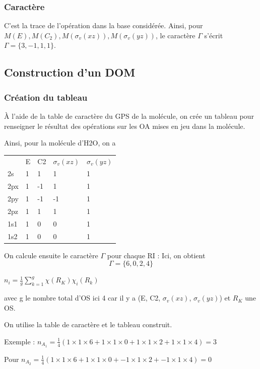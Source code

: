 \documentclass[french]{yLectureNote}
\begin{document}
\subsubsection{Caractère}
C'est la trace de l'opération dans la base considérée. Ainsi, pour \(M(E), M(C_2), M(\sigma_v(xz)), M(\sigma_v(yz))\), le caractère \(\Gamma\) s'écrit \(\Gamma = \{3,-1,1,1\}\).
\subsection{Construction d'un DOM}
\subsubsection{Création du tableau}
À l'aide de la table de caractère du GPS de la molécule, on crée un tableau pour renseigner le résultat des opérations sur les OA mises en jeu dans la molécule.

Ainsi, pour la molécule d'H2O, on a
\begin{center}
\begin{tabular}{lllll}
 & E & C2 & \(\sigma_v(xz)\) & \(\sigma_v(yz)\)\\
2s & 1 & 1 & 1 & 1\\
2px & 1 & -1 & 1 & 1\\
2py & 1 & -1 & -1 & 1\\
2pz & 1 & 1 & 1 & 1\\
1s1 & 1 & 0 & 0 & 1\\
1s2 & 1 & 0 & 0 & 1
\end{tabular}
\end{center}
On calcule ensuite le caractère \(\Gamma\) pour chaque RI : Ici, on obtient \[\Gamma = \{6, 0, 2, 4\}\]
\begin{theorem}
\(n_i = \frac{1}{g}\sum_{k=1}^g \chi(R_K)\chi_i(R_k)\)
\end{theorem}
avec g le nombre total d'OS ici 4 car il y a (E, C2, \(\sigma_v(xz)\), \(\sigma_v(yz)\)) et  \(R_K\) une OS.

On utilise la table de caractère et le tableau construit.

Exemple : \(n_{A_1} = \frac{1}{4}(1\times1\times 6 + 1\times1\times 0 + 1\times1\times 2 + 1\times1\times 4) = 3\)

Pour \(n_{A_2} = \frac{1}{4}(1\times1\times 6 + 1\times1\times 0 + -1\times1\times 2 + -1\times1\times 4) = 0\)
\end{document}
